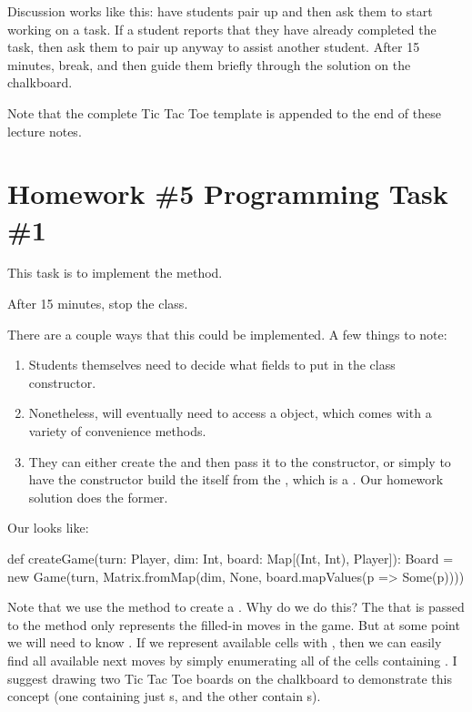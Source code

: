 \documentclass{book}
\begin{document}
Discussion works like this: have students pair up and then ask them to start working on a task.  If a student reports that they have already completed the task, then ask them to pair up anyway to assist another student.  After 15 minutes, break, and then guide them briefly through the solution on the chalkboard.

Note that the complete Tic Tac Toe template is appended to the end of these lecture notes.

\section{Homework \#5 Programming Task \#1}

This task is to implement the  method.

After 15 minutes, stop the class.

There are a couple ways that this could be implemented.  A few things to note:

\begin{enumerate}
  \item Students themselves need to decide what fields to put in the  class constructor.
  \item Nonetheless,  will eventually need to access a  object, which comes with a variety of convenience methods.
  \item They can either create the  and then pass it to the  constructor, or simply to have the  constructor build the  itself from the , which is a .  Our homework solution does the former.
\end{enumerate}

Our  looks like:

\begin{scalacode}
  def createGame(turn: Player, dim: Int, board: Map[(Int, Int), Player]): Board = {
      new Game(turn, Matrix.fromMap(dim, None, board.mapValues(p => Some(p))))
  }
\end{scalacode}

Note that we use the  method to create a .  Why do we do this?  The  that is passed to the  method only represents the filled-in moves in the game.  But at some point we will need to know .  If we represent available cells with , then we can easily find all available next moves by simply enumerating all of the cells containing .  I suggest drawing two Tic Tac Toe boards on the chalkboard to demonstrate this concept (one containing just s, and the other contain s).
\end{document}
